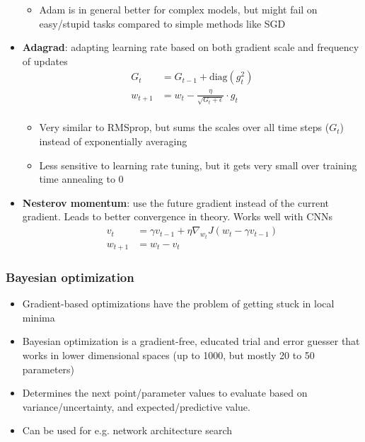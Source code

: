 \begin{itemize}
\begin{itemize}
		\item Adam is in general better for complex models, but might fail on easy/stupid tasks compared to simple methods like SGD
	\end{itemize}
	\item \textbf{Adagrad}: adapting learning rate based on both gradient scale and frequency of updates
	\begin{equation*}
		\begin{split}
			G_t & = G_{t-1} + \text{diag}\left(g_t^2\right)\\
			w_{t+1} & = w_{t} - \frac{\eta}{\sqrt{G_t + \epsilon}}\cdot g_t\\
		\end{split}
	\end{equation*}
	\begin{itemize}
		\item Very similar to RMSprop, but sums the scales over all time steps ($G_t$) instead of exponentially averaging 
		\item Less sensitive to learning rate tuning, but it gets very small over training time annealing to 0
	\end{itemize} 
	\item \textbf{Nesterov momentum}: use the future gradient instead of the current gradient. Leads to better convergence in theory. Works well with CNNs
	\begin{equation*}
		\begin{split}
			v_t &= \gamma v_{t-1} + \eta \nabla_{w_t} J(w_t - \gamma v_{t-1}) \\
			w_{t+1} &= w_t - v_t
		\end{split}
	\end{equation*}
\end{itemize}
\subsubsection{Bayesian optimization}
\begin{itemize}
	\item Gradient-based optimizations have the problem of getting stuck in local minima
	\item Bayesian optimization is a gradient-free, educated trial and error guesser that works in lower dimensional spaces (up to 1000, but mostly 20 to 50 parameters)
	\item Determines the next point/parameter values to evaluate based on variance/uncertainty, and expected/predictive value. 
	\item Can be used for e.g. network architecture search
\end{itemize}

